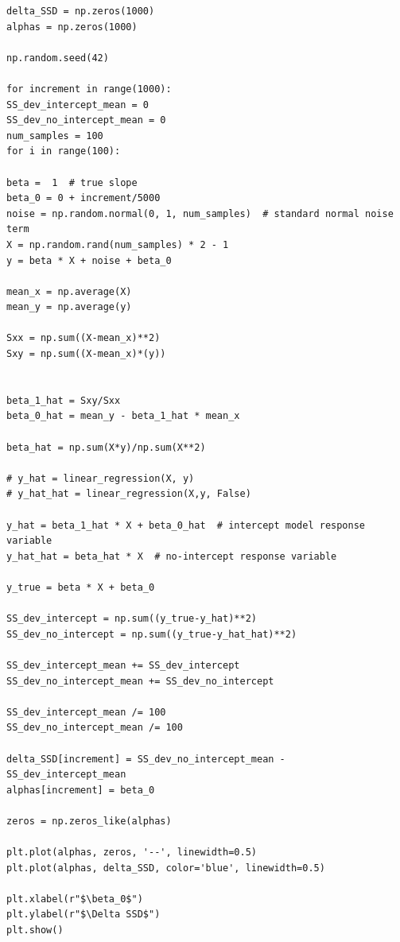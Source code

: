 \documentclass[12pt,a4paper,oneside]{book} %
\begin{document}
	
\begin{mdframed}[linecolor=black, topline=true, bottomline=true,
	leftline=false, rightline=false, backgroundcolor=yellow!20!white]
	\begin{verbatim}
delta_SSD = np.zeros(1000)
alphas = np.zeros(1000)

np.random.seed(42)

for increment in range(1000):
SS_dev_intercept_mean = 0
SS_dev_no_intercept_mean = 0
num_samples = 100 
for i in range(100):

beta =  1  # true slope
beta_0 = 0 + increment/5000
noise = np.random.normal(0, 1, num_samples)  # standard normal noise term
X = np.random.rand(num_samples) * 2 - 1
y = beta * X + noise + beta_0

mean_x = np.average(X)
mean_y = np.average(y)

Sxx = np.sum((X-mean_x)**2)
Sxy = np.sum((X-mean_x)*(y))


beta_1_hat = Sxy/Sxx
beta_0_hat = mean_y - beta_1_hat * mean_x

beta_hat = np.sum(X*y)/np.sum(X**2)

# y_hat = linear_regression(X, y)
# y_hat_hat = linear_regression(X,y, False)

y_hat = beta_1_hat * X + beta_0_hat  # intercept model response variable
y_hat_hat = beta_hat * X  # no-intercept response variable

y_true = beta * X + beta_0

SS_dev_intercept = np.sum((y_true-y_hat)**2)
SS_dev_no_intercept = np.sum((y_true-y_hat_hat)**2)

SS_dev_intercept_mean += SS_dev_intercept
SS_dev_no_intercept_mean += SS_dev_no_intercept

SS_dev_intercept_mean /= 100
SS_dev_no_intercept_mean /= 100

delta_SSD[increment] = SS_dev_no_intercept_mean - SS_dev_intercept_mean
alphas[increment] = beta_0
	
zeros = np.zeros_like(alphas)

plt.plot(alphas, zeros, '--', linewidth=0.5)
plt.plot(alphas, delta_SSD, color='blue', linewidth=0.5)

plt.xlabel(r"$\beta_0$")
plt.ylabel(r"$\Delta SSD$")
plt.show()

		\end{verbatim}
\end{mdframed}
	
	
	
	
\end{document}
